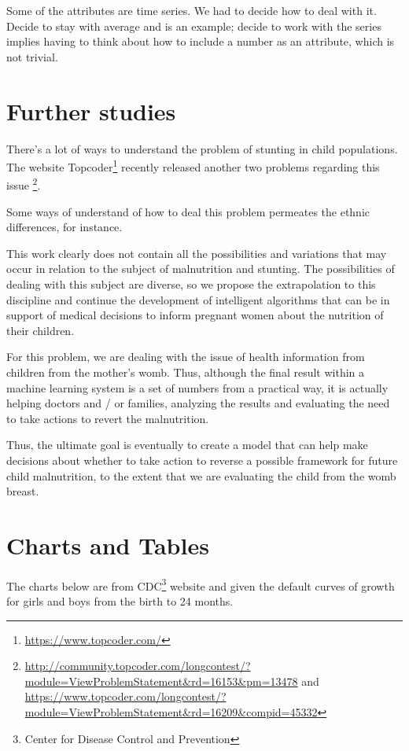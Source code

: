 \documentclass[10pt,twocolumn,letterpaper]{article}
\begin{document}
Some of the attributes are time series. We had to decide how to deal with it. Decide to stay with average and is an example; decide to work with the series implies having to think about how to include a number as an attribute, which is not trivial.

\section{Further studies}

There's a lot of ways to understand the problem of stunting in child populations. The website Topcoder\footnote{\url{https://www.topcoder.com/}} recently released another two problems regarding this issue \footnote{\url{http://community.topcoder.com/longcontest/?module=ViewProblemStatement&rd=16153&pm=13478} and \url{https://www.topcoder.com/longcontest/?module=ViewProblemStatement&rd=16209&compid=45332}}.

Some ways of understand of how to deal this problem permeates the ethnic differences, for instance. 

This work clearly does not contain all the possibilities and variations that may occur in relation to the subject of malnutrition and stunting. The possibilities of dealing with this subject are diverse, so we propose the extrapolation to this discipline and continue the development of intelligent algorithms that can be in support of medical decisions to inform pregnant women about the nutrition of their children.

For this problem, we are dealing with the issue of health information from children from the mother's womb. Thus, although the final result within a machine learning system is a set of numbers from a practical way, it is actually helping doctors and / or families, analyzing the results and evaluating the need to take actions to revert the malnutrition.

Thus, the ultimate goal is eventually to create a model that can help make decisions about whether to take action to reverse a possible framework for future child malnutrition, to the extent that we are evaluating the child from the womb breast.

\section{Charts and Tables}
The charts below are from CDC\footnote{Center for Disease Control and Prevention} website and given the default curves of growth for girls and boys from the birth to 24 months. 
\end{document}
